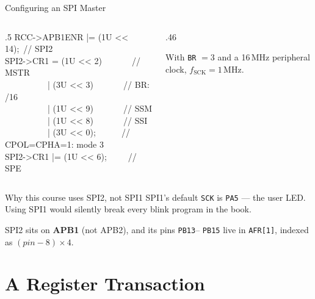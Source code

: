 \documentclass[9pt,aspectratio=169,xcolor=table]{beamer}
\begin{document}
\begin{frame}{Configuring an SPI Master}
    \begin{columns}[T]
    \begin{column}{.5\textwidth}
        {\ttfamily\scriptsize
        RCC->APB1ENR |= (1U <{}< 14);~// SPI2 \\[1mm]
        SPI2->CR1 = (1U <{}< 2)~~~~~~~// MSTR \\
        ~~~~~~~~~~| (3U <{}< 3)~~~~~~~// BR: /16 \\
        ~~~~~~~~~~| (1U <{}< 9)~~~~~~~// SSM \\
        ~~~~~~~~~~| (1U <{}< 8)~~~~~~~// SSI \\
        ~~~~~~~~~~| (3U <{}< 0);~~~~~~// CPOL=CPHA=1: mode 3 \\
        SPI2->CR1 |= (1U <{}< 6);~~~~~// SPE}
    \end{column}
    \begin{column}{.46\textwidth}
        \begin{center}
        \end{center}

        \vspace{2mm}
        {\small With \texttt{BR} $=3$ and a 16\,MHz peripheral clock,
        $f_{\text{SCK}} = 1$\,MHz.}
    \end{column}
    \end{columns}

    \vspace{3mm}
    \begin{block}{Why this course uses SPI2, not SPI1}
        SPI1's default \texttt{SCK} is \alert{\texttt{PA5}} --- the user LED. Using
        SPI1 would silently break every blink program in the book.

        \vspace{1mm}
        SPI2 sits on \textbf{APB1} (not APB2), and its pins \texttt{PB13}--%
        \texttt{PB15} live in \texttt{AFR[1]}, indexed as $(pin-8) \times 4$.
    \end{block}
\end{frame}


\section{A Register Transaction}
\end{document}
